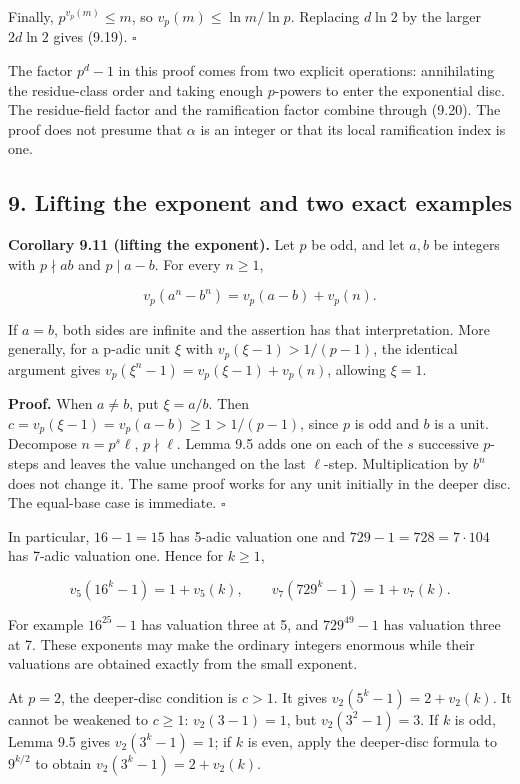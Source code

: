 \documentclass[
  11pt,
  a4paper,
]{article}
\begin{document}
Finally, \(p^{v_p(m)}\le m\), so \(v_p(m)\le\ln m/\ln p\). Replacing
\(d\ln2\) by the larger \(2d\ln2\) gives (9.19). \(\square\)

The factor \(p^d-1\) in this proof comes from two explicit operations:
annihilating the residue-class order and taking enough \(p\)-powers to
enter the exponential disc. The residue-field factor and the
ramification factor combine through (9.20). The proof does not presume
that \(\alpha\) is an integer or that its local ramification index is
one.

\subsection{9. Lifting the exponent and two exact
examples}\label{lifting-the-exponent-and-two-exact-examples}

\textbf{Corollary 9.11 (lifting the exponent).} Let \(p\) be odd, and
let \(a,b\) be integers with \(p\nmid ab\) and \(p\mid a-b\). For every
\(n\ge1\),

\[
v_p(a^n-b^n)=v_p(a-b)+v_p(n).
\tag{9.23}
\]

If \(a=b\), both sides are infinite and the assertion has that
interpretation. More generally, for a p-adic unit \(\xi\) with
\(v_p(\xi-1)>1/(p-1)\), the identical argument gives
\(v_p(\xi^n-1)=v_p(\xi-1)+v_p(n)\), allowing \(\xi=1\).

\textbf{Proof.} When \(a\ne b\), put \(\xi=a/b\). Then
\(c=v_p(\xi-1)=v_p(a-b)\ge1>1/(p-1)\), since \(p\) is odd and \(b\) is a
unit. Decompose \(n=p^s\ell\), \(p\nmid\ell\). Lemma 9.5 adds one on
each of the \(s\) successive \(p\)-steps and leaves the value unchanged
on the last \(\ell\)-step. Multiplication by \(b^n\) does not change it.
The same proof works for any unit initially in the deeper disc. The
equal-base case is immediate. \(\square\)

In particular, \(16-1=15\) has 5-adic valuation one and
\(729-1=728=7\cdot104\) has 7-adic valuation one. Hence for \(k\ge1\),

\[
v_5(16^k-1)=1+v_5(k),
\qquad v_7(729^k-1)=1+v_7(k).
\tag{9.24}
\]

For example \(16^{25}-1\) has valuation three at 5, and \(729^{49}-1\)
has valuation three at 7. These exponents may make the ordinary integers
enormous while their valuations are obtained exactly from the small
exponent.

At \(p=2\), the deeper-disc condition is \(c>1\). It gives
\(v_2(5^k-1)=2+v_2(k)\). It cannot be weakened to \(c\ge1\):
\(v_2(3-1)=1\), but \(v_2(3^2-1)=3\). If \(k\) is odd, Lemma 9.5 gives
\(v_2(3^k-1)=1\); if \(k\) is even, apply the deeper-disc formula to
\(9^{k/2}\) to obtain \(v_2(3^k-1)=2+v_2(k)\).
\end{document}
